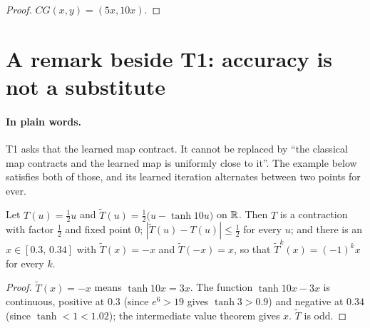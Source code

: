\begin{proof}
  \leanok
  $CG(x,y)=(5x,10x)$.
\end{proof}

\section{A remark beside T1: accuracy is not a substitute}

\paragraph{In plain words.}
T1 asks that the learned map contract.  It cannot be replaced by ``the
classical map contracts and the learned map is uniformly close to it''.  The
example below satisfies both of those, and its learned iteration alternates
between two points for ever.

\begin{example}\label{ex:sni}
  \leanok
  Let $T(u)=\tfrac12u$ and $\tilde T(u)=\tfrac12\bigl(u-\tanh10u\bigr)$ on $\mathbb{R}$.
  Then $T$ is a contraction with factor $\tfrac12$ and fixed point $0$;
  $|\tilde T(u)-T(u)|\le\tfrac12$ for every $u$; and there is an
  $x\in[0.3,\,0.34]$ with $\tilde T(x)=-x$ and $\tilde T(-x)=x$, so that
  $\tilde T^k(x)=(-1)^kx$ for every $k$.
\end{example}

\begin{proof}
  \leanok
  $\tilde T(x)=-x$ means $\tanh10x=3x$.  The function $\tanh10x-3x$ is
  continuous, positive at $0.3$ (since $e^6>19$ gives $\tanh3>0.9$) and
  negative at $0.34$ (since $\tanh<1<1.02$); the intermediate value theorem
  gives $x$.  $\tilde T$ is odd.
\end{proof}
